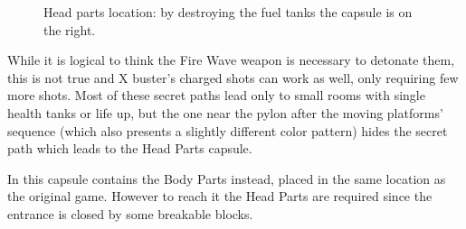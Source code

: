\begin{figure}[htp]
\begin{subfigure}{0.4\linewidth}
		\caption{}
	\end{subfigure}
	\caption{Head parts location: by destroying the fuel tanks the capsule is on the right.}
\end{figure}While it is logical to think the Fire Wave weapon is necessary to detonate them, this is not true and X buster's charged shots can work as well, only requiring few more shots. Most of these secret paths lead only to small rooms with single health tanks or life up, but the one near the pylon after the moving platforms' sequence (which also presents a slightly different color pattern) hides the  secret path which leads to the Head Parts capsule. 

In \mhx this capsule contains the Body Parts instead, placed in the same location as the original game. However to reach it the Head Parts are required since the entrance is closed by some breakable blocks.

